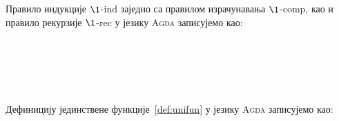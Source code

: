 Правило индукције $\1$-ind заједно са правилом израчунавања $\1$-comp, као и правило рекурзије $\1$-rec у језику \textsc{Agda} записујемо као:
\begin{code}%
\>[0]\AgdaSpace{}%
\AgdaSymbol{:}\AgdaSpace{}%
\AgdaSymbol{(}\AgdaSpace{}%
\AgdaSymbol{:}\AgdaSpace{}%
\AgdaSpace{}%
\AgdaSpace{}%
\AgdaSpace{}%
\AgdaSpace{}%
\AgdaSymbol{)}\AgdaSpace{}%
\AgdaSpace{}%
\AgdaSpace{}%
\AgdaSpace{}%
\AgdaSpace{}%
\AgdaSymbol{(}\AgdaSpace{}%
\AgdaSymbol{:}\AgdaSpace{}%
\AgdaSymbol{)}\AgdaSpace{}%
\AgdaSpace{}%
\AgdaSpace{}%
\<%
\\
\>[0]\AgdaSpace{}%
\AgdaSpace{}%
\AgdaSpace{}%
\AgdaSpace{}%
\AgdaSymbol{=}\AgdaSpace{}%
\<%
\\
%
\\[\AgdaEmptyExtraSkip]%
\>[0]\AgdaSpace{}%
\AgdaSymbol{:}\AgdaSpace{}%
\AgdaSymbol{(}\AgdaSpace{}%
\AgdaSymbol{:}\AgdaSpace{}%
\AgdaSpace{}%
\AgdaSpace{}%
\AgdaSymbol{)}\AgdaSpace{}%
\AgdaSpace{}%
\AgdaSpace{}%
\AgdaSpace{}%
\AgdaSpace{}%
\AgdaSpace{}%
\<%
\\
\>[0]\AgdaSpace{}%
\AgdaSpace{}%
\AgdaSymbol{=}\AgdaSpace{}%
\AgdaSpace{}%
\AgdaSpace{}%
\AgdaBound{\AgdaUnderscore{}}\AgdaSpace{}%
\AgdaSpace{}%
\AgdaSymbol{)}\<%
\end{code}

Дефиницију јединствене функције~\ref{def:unifun} у језику \textsc{Agda} записујемо као:
\begin{code}%
\>[0]\AgdaSpace{}%
\AgdaSymbol{:}\AgdaSpace{}%
\AgdaSymbol{\{}\AgdaSpace{}%
\AgdaSymbol{:}\AgdaSpace{}%
\AgdaSpace{}%
\AgdaSpace{}%
\AgdaSymbol{\}}\AgdaSpace{}%
\AgdaSpace{}%
\AgdaSpace{}%
\AgdaSpace{}%
\<%
\\
\>[0]\AgdaSpace{}%
\AgdaSpace{}%
\AgdaSymbol{=}\AgdaSpace{}%
\<%
\end{code}

